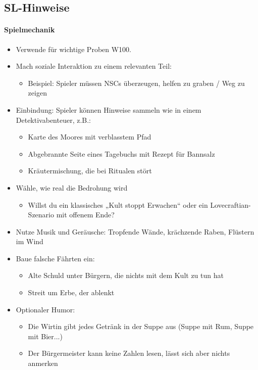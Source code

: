 \subsection{SL-Hinweise}
\paragraph{Spielmechanik}
\begin{itemize}
    \item Verwende für wichtige Proben W100.
    \item Mach soziale Interaktion zu einem relevanten Teil:
    \begin{itemize}
        \item Beispiel: Spieler müssen NSCs überzeugen, helfen zu graben / Weg zu zeigen
    \end{itemize}
    \item Einbindung: Spieler können Hinweise sammeln wie in einem Detektivabenteuer, z.B.:
    \begin{itemize}
        \item Karte des Moores mit verblasstem Pfad
        \item Abgebrannte Seite eines Tagebuchs mit Rezept für Bannsalz
        \item Kräutermischung, die bei Ritualen stört
	\end{itemize}
    \item Wähle, wie real die Bedrohung wird
    \begin{itemize}
        \item Willst du ein klassisches „Kult stoppt Erwachen“ oder ein Lovecraftian-Szenario mit offenem Ende?
	\end{itemize}
    \item Nutze Musik und Geräusche: Tropfende Wände, krächzende Raben, Flüstern im Wind
    \item Baue falsche Fährten ein:
    \begin{itemize}
        \item Alte Schuld unter Bürgern, die nichts mit dem Kult zu tun hat
        \item Streit um Erbe, der ablenkt
	\end{itemize}
    \item Optionaler Humor:
    \begin{itemize}
        \item Die Wirtin gibt jedes Getränk in der Suppe aus (Suppe mit Rum, Suppe mit Bier...)
        \item Der Bürgermeister kann keine Zahlen lesen, lässt sich aber nichts anmerken
	\end{itemize}	
\end{itemize}
\newpage
